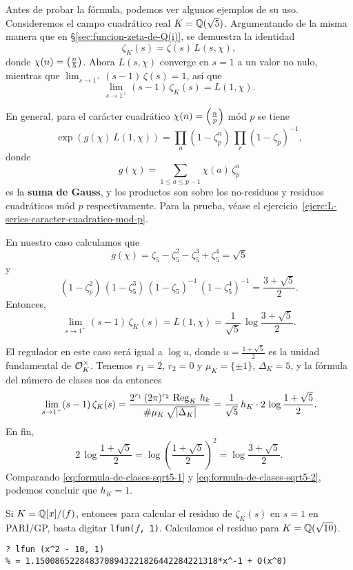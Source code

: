 Antes de probar la fórmula, podemos ver algunos ejemplos de su uso. Consideremos
el campo cuadrático real $K = \mathbb{Q} (\sqrt{5})$. Argumentando de la misma manera
que en \S\ref{sec:funcion-zeta-de-Q(i)}, se demuestra la identidad
$$\zeta_K (s) = \zeta (s) \, L (s,\chi),$$
donde $\chi (n) = \left(\frac{n}{5}\right)$.
Ahora $L (s,\chi)$ converge en $s = 1$ a un valor no nulo, mientras que
$\lim_{s\to 1^+} (s - 1)\,\zeta (s) = 1$, así que
$$\lim_{s \to 1^+} (s - 1)\,\zeta_K (s) = L (1,\chi).$$

En general, para el carácter cuadrático $\chi (n) = \left(\frac{n}{p}\right)$ mód $p$
se tiene
$$\exp (g (\chi)\,L (1,\chi)) = \prod_n (1 - \zeta_p^n)\,\prod_r (1 - \zeta_p)^{-1},$$
donde
$$g (\chi) = \sum_{1 \le a \le p-1} \chi (a)\,\zeta_p^a$$
es la \textbf{suma de Gauss}, y los productos son sobre los no-residuos y
residuos cuadráticos mód $p$ respectivamente. Para la prueba, véase
el ejercicio~\ref{ejerc:L-series-caracter-cuadratico-mod-p}.

En nuestro caso calculamos que
$$g (\chi) = \zeta_5 - \zeta_5^2 - \zeta_5^3 + \zeta_5^4 = \sqrt{5}$$
y
$$(1 - \zeta_p^2)\,(1 - \zeta_5^3)\,(1 - \zeta_5)^{-1}\,(1 - \zeta_5^4)^{-1} = \frac{3 + \sqrt{5}}{2}.$$
Entonces,
\begin{equation}
  \label{eq:formula-de-clases-sqrt5-1}
  \lim_{s \to 1^+} (s - 1)\,\zeta_K (s) =
  L (1, \chi) = \frac{1}{\sqrt{5}}\,\log\frac{3 + \sqrt{5}}{2}.
\end{equation}

El regulador en este caso será igual a $\log u$, donde
$u = \frac{1+\sqrt{5}}{2}$ es la unidad fundamental de $\mathcal{O}_K^\times$.
Tenemos $r_1 = 2$, $r_2 = 0$ y $\mu_K = \{ \pm 1 \}$, $\Delta_K = 5$, y la
fórmula del número de clases nos da entonces
\begin{equation}
  \label{eq:formula-de-clases-sqrt5-2}
  \lim_{s \to 1^+} (s - 1)\,\zeta_K (s) =
  \frac{2^{r_1}\,(2\pi)^{r_2}\,\operatorname{Reg}_K\,h_k}{\#\mu_K\,\sqrt{|\Delta_K|}} =
  \frac{1}{\sqrt{5}}\,h_K\cdot 2\,\log \frac{1+\sqrt{5}}{2}.
\end{equation}
En fin,
\[ 2\,\log \frac{1+\sqrt{5}}{2} =
   \log \left(\frac{1+\sqrt{5}}{2}\right)^2 =
   \log \frac{3+\sqrt{5}}{2}. \]
Comparando \eqref{eq:formula-de-clases-sqrt5-1} y
\eqref{eq:formula-de-clases-sqrt5-2}, podemos concluir que $h_K = 1$.

\vspace{1em}

Si $K = \mathbb{Q}[x]/(f)$, entonces para calcular el residuo de $\zeta_K (s)$ en
$s = 1$ en PARI/GP, basta digitar \texttt{lfun($f$, 1)}. Calculamos el residuo
para $K = \mathbb{Q} (\sqrt{10})$.
\begin{shaded}
\begin{verbatim}
? lfun (x^2 - 10, 1)
% = 1.1500865228483708943221826442284221318*x^-1 + O(x^0)
\end{verbatim}
\end{shaded}

